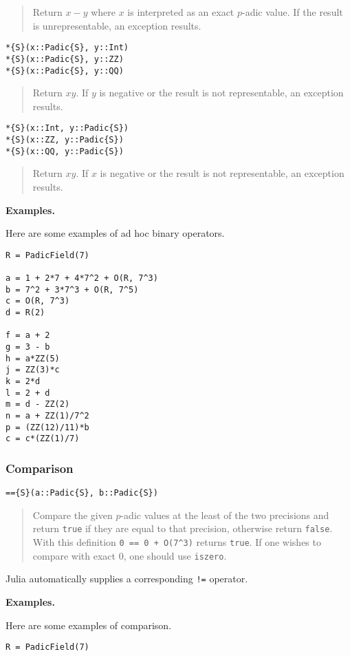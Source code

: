 \documentclass[a4paper,10pt]{article}
\newcommand{\code}{\lstinline}
\newcommand{\desc}[1]{\vspace{-3mm}\begin{quote}#1\end{quote}}
\begin{document}
{{{\desc{Return $x - y$ where $x$ is interpreted as an exact $p$-adic value. If
the result is unrepresentable, an exception results.}

\begin{lstlisting}
*{S}(x::Padic{S}, y::Int)
*{S}(x::Padic{S}, y::ZZ)
*{S}(x::Padic{S}, y::QQ)
\end{lstlisting}

\desc{Return $xy$. If $y$ is negative or the result is not representable, an
exception results.}

\begin{lstlisting}
*{S}(x::Int, y::Padic{S})
*{S}(x::ZZ, y::Padic{S})
*{S}(x::QQ, y::Padic{S})
\end{lstlisting}

\desc{Return $xy$. If $x$ is negative or the result is not representable, an 
exception results.}

\textbf{Examples.}

Here are some examples of ad hoc binary operators.

\begin{lstlisting}
R = PadicField(7)

a = 1 + 2*7 + 4*7^2 + O(R, 7^3)
b = 7^2 + 3*7^3 + O(R, 7^5)
c = O(R, 7^3)
d = R(2)

f = a + 2
g = 3 - b
h = a*ZZ(5)
j = ZZ(3)*c
k = 2*d
l = 2 + d
m = d - ZZ(2)
n = a + ZZ(1)/7^2
p = (ZZ(12)/11)*b
c = c*(ZZ(1)/7)
\end{lstlisting}

\subsubsection{Comparison}

\begin{lstlisting}
=={S}(a::Padic{S}, b::Padic{S})
\end{lstlisting}

\desc{Compare the given $p$-adic values at the least of the two precisions and
return \code{true} if they are equal to that precision, otherwise return
\code{false}. With this definition \code{0 == 0 + O(7^3)} returns
\code{true}. If one wishes to compare with exact $0$, one should use
\code{iszero}.}

Julia automatically supplies a corresponding \code{!=} operator.

\textbf{Examples.}

Here are some examples of comparison.

\begin{lstlisting}
R = PadicField(7)


\end{lstlisting}}}}
\end{document}
